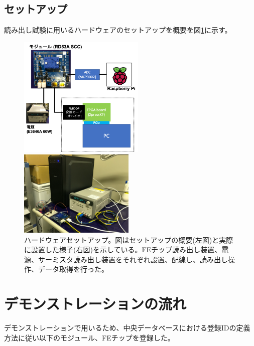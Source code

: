 \subsection{セットアップ}
読み出し試験に用いるハードウェアのセットアップを概要を図\ref{readout_setup_overview}に示す。

\begin{figure}[bpt]\centering
  \begin{minipage}{0.5\hsize}
    \includegraphics[width=6cm]{./HW_setup.png}
  \end{minipage}
  \begin{minipage}{0.4\hsize}
    \includegraphics[width=5.5cm]{./HW_setup_pic.png}
  \end{minipage}
\caption[ハードウェアセットアップ]{ハードウェアセットアップ。図はセットアップの概要(左図)と実際に設置した様子(右図)を示している。FEチップ読み出し装置、電源、サーミスタ読み出し装置をそれぞれ設置、配線し、読み出し操作、データ取得を行った。}
\label{readout_setup_overview}
\end{figure}


\clearpage
\section{デモンストレーションの流れ}
デモンストレーションで用いるため、中央データベースにおける登録IDの定義方法\cite{5-11}に従い以下のモジュール、FEチップを登録した。

